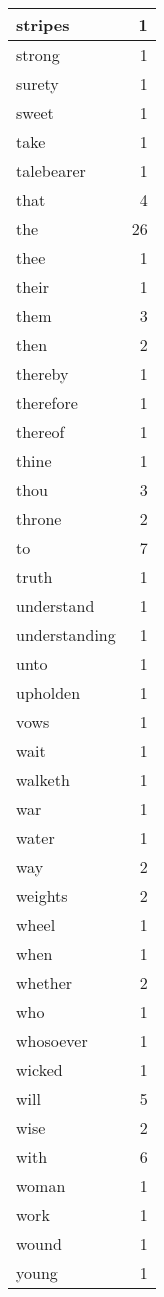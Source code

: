 \begin{center}
\begin{longtable}{l|r}
stripes & 1\\ \hline 
strong & 1\\ \hline 
surety & 1\\ \hline 
sweet & 1\\ \hline 
take & 1\\ \hline 
talebearer & 1\\ \hline 
that & 4\\ \hline 
the & 26\\ \hline 
thee & 1\\ \hline 
their & 1\\ \hline 
them & 3\\ \hline 
then & 2\\ \hline 
thereby & 1\\ \hline 
therefore & 1\\ \hline 
thereof & 1\\ \hline 
thine & 1\\ \hline 
thou & 3\\ \hline 
throne & 2\\ \hline 
to & 7\\ \hline 
truth & 1\\ \hline 
understand & 1\\ \hline 
understanding & 1\\ \hline 
unto & 1\\ \hline 
upholden & 1\\ \hline 
vows & 1\\ \hline 
wait & 1\\ \hline 
walketh & 1\\ \hline 
war & 1\\ \hline 
water & 1\\ \hline 
way & 2\\ \hline 
weights & 2\\ \hline 
wheel & 1\\ \hline 
when & 1\\ \hline 
whether & 2\\ \hline 
who & 1\\ \hline 
whosoever & 1\\ \hline 
wicked & 1\\ \hline 
will & 5\\ \hline 
wise & 2\\ \hline 
with & 6\\ \hline 
woman & 1\\ \hline 
work & 1\\ \hline 
wound & 1\\ \hline 
young & 1\\ \hline 
\end{longtable}  
\end{center}  


